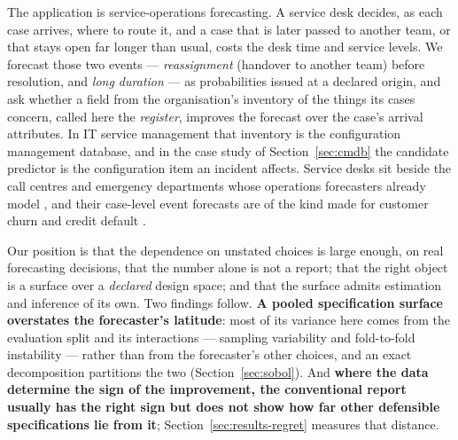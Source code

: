 The application is service-operations forecasting. A service desk decides,
as each case arrives, where to route it, and a case that is later passed to
another team, or that stays open far longer than usual, costs the desk time
and service levels. We forecast those two events --- \emph{reassignment}
(handover to another team) before resolution, and \emph{long duration} --- as
probabilities issued at a declared origin, and ask whether a field from the
organisation's inventory of the things its cases concern, called here the
\emph{register}, improves the forecast over the case's arrival attributes. In
IT service management that inventory is the configuration management
database, and in the case study of Section~\ref{sec:cmdb} the candidate
predictor is the configuration item an incident affects. Service desks sit
beside the call centres and emergency departments whose operations
forecasters already model \citep{ibrahim2016modeling,rostamitabar2022anticipating},
and their case-level event forecasts are of the kind made for customer churn
and credit default \citep{decaigny2020incorporating,liu2023tree}.

Our position is that the dependence on unstated choices is large enough, on
real forecasting decisions, that the number alone is not a report; that the
right object is a surface over a \emph{declared} design space; and that the
surface admits estimation and inference of its own. Two findings follow.
\textbf{A pooled specification surface overstates the forecaster's
latitude}: most of its variance here comes from the evaluation split and its
interactions --- sampling variability and fold-to-fold instability ---
rather than from the forecaster's other choices, and an exact decomposition
partitions the two
(Section~\ref{sec:sobol}). And \textbf{where the data determine the sign of
the improvement, the conventional report usually has the right sign but does
not show how far other defensible specifications lie from it};
Section~\ref{sec:results-regret} measures that distance.

